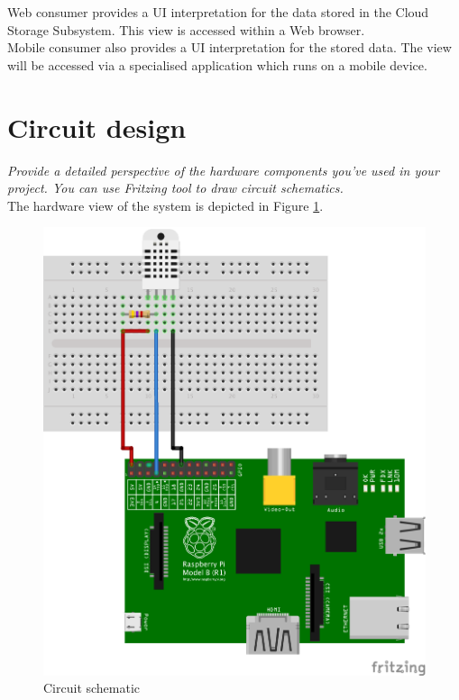 \documentclass[a4paper,11pt]{article}
\begin{document}
Web consumer provides a UI interpretation for the data stored in the Cloud Storage Subsystem. This view is accessed within a Web browser.\\

Mobile consumer also provides a UI interpretation for the stored data. The view will be accessed via a specialised application which runs on a mobile device.

\section{Circuit design}
\textit{Provide a detailed perspective of the hardware components you’ve used in your project. You can use Fritzing tool to draw circuit schematics.}\\

The hardware view of the system is depicted in Figure \ref{fig:circuit-design}.

\begin{figure}[h]
\centering
\includegraphics[scale=0.7]{circuit-design.png}
\caption{Circuit schematic}
\label{fig:circuit-design}
\end{figure}
\end{document}
